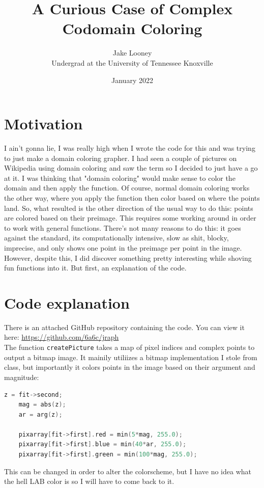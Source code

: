 \documentclass[letterpaper,12pt]{article}
\begin{document}
\title{A Curious Case of Complex Codomain Coloring}
\author{Jake Looney\\ Undergrad at the University of Tennessee Knoxville}
\date{January 2022}
\maketitle

\tableofcontents
\newpage
{}

\section{Motivation}
I ain't gonna lie, I was really high when I wrote the code for this and was trying to just make a domain coloring grapher.
I had seen a couple of pictures on Wikipedia using domain coloring and saw the term so I decided to just have a go at it.
I was thinking that "domain coloring" would make sense to color the domain and then apply the function.
Of course, normal domain coloring works the other way, where you apply the function then color based on where the points land.
So, what resulted is the other direction of the usual way to do this: points are colored based on their preimage.
This requires some working around in order to work with general functions.
There's not many reasons to do this: it goes against the standard, its computationally intensive, slow as shit, blocky, imprecise, and only shows one point in the preimage per point in the image.
However, despite this, I did discover something pretty interesting while shoving fun functions into it. But first, an explanation of the code.

\section{Code explanation}
There is an attached GitHub repository containing the code. You can view it here: \url{https://github.com/6a6c/jraph} \\

The function \verb|createPicture| takes a map of pixel indices and complex points to output a bitmap image.
It mainily utiliizes a bitmap implementation I stole from class, but importantly it colors points in the image based on their argument and magnitude:
\begin{lstlisting}[language=c++]
    z = fit->second;
    mag = abs(z);
    ar = arg(z);

    pixarray[fit->first].red = min(5*mag, 255.0);
    pixarray[fit->first].blue = min(40*ar, 255.0);
    pixarray[fit->first].green = min(100*mag, 255.0);
\end{lstlisting}
This can be changed in order to alter the colorscheme, but I have no idea what the hell LAB color is so I will have to come back to it.\\
\end{document}
